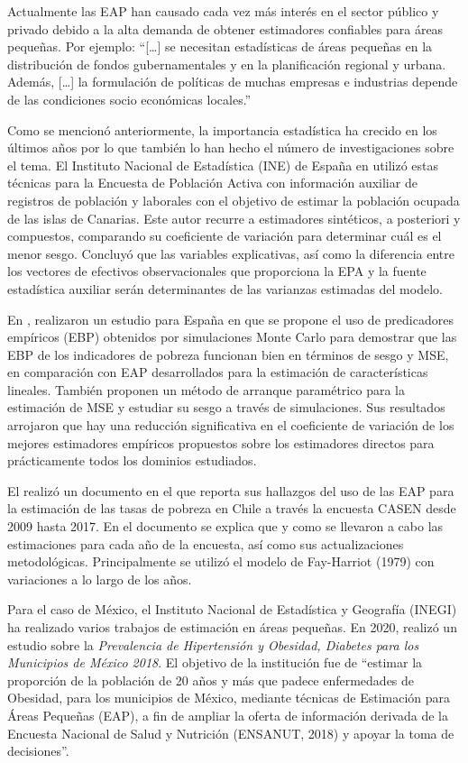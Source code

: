 \documentclass[
  11pt,
  spanish,
  oneside]{book}
\begin{document}
Actualmente las EAP han causado cada vez más interés en el sector público y privado debido a la alta demanda de obtener estimadores confiables para áreas pequeñas. Por ejemplo: ``{[}\ldots{]} se necesitan estadísticas de áreas pequeñas en la distribución de fondos gubernamentales y en la planificación regional y urbana. Además, {[}\ldots{]} la formulación de políticas de muchas empresas e industrias depende de las condiciones socio económicas locales.'' \citep[p.~56]{Gosh&Rao1994}

Como se mencionó anteriormente, la importancia estadística ha crecido en los últimos años por lo que también lo han hecho el número de investigaciones sobre el tema. El Instituto Nacional de Estadística (INE) de España en \citep{Paños2000} utilizó estas técnicas para la Encuesta de Población Activa con información auxiliar de registros de población y laborales con el objetivo de estimar la población ocupada de las islas de Canarias. Este autor recurre a estimadores sintéticos, a posteriori y compuestos, comparando su coeficiente de variación para determinar cuál es el menor sesgo. Concluyó que las variables explicativas, así como la diferencia entre los vectores de efectivos observacionales que proporciona la EPA y la fuente estadística auxiliar serán determinantes de las varianzas estimadas del modelo.

En \citep{Molina2010}, realizaron un estudio para España en que se propone el uso de predicadores empíricos (EBP) obtenidos por simulaciones Monte Carlo para demostrar que las EBP de los indicadores de pobreza funcionan bien en términos de sesgo y MSE, en comparación con EAP desarrollados para la estimación de características lineales. También proponen un método de arranque paramétrico para la estimación de MSE y estudiar su sesgo a través de simulaciones. Sus resultados arrojaron que hay una reducción significativa en el coeficiente de variación de los mejores estimadores empíricos propuestos sobre los estimadores directos para prácticamente todos los dominios estudiados.

El \citep{Ministerio2017} realizó un documento en el que reporta sus hallazgos del uso de las EAP para la estimación de las tasas de pobreza en Chile a través la encuesta CASEN desde 2009 hasta 2017. En el documento se explica que y como se llevaron a cabo las estimaciones para cada año de la encuesta, así como sus actualizaciones metodológicas. Principalmente se utilizó el modelo de Fay-Harriot (1979) con variaciones a lo largo de los años.

Para el caso de México, el Instituto Nacional de Estadística y Geografía (INEGI) ha realizado varios trabajos de estimación en áreas pequeñas. En 2020, realizó un estudio sobre la \emph{Prevalencia de Hipertensión y Obesidad, Diabetes para los Municipios de México 2018}. El objetivo de la institución fue de ``estimar la proporción de la población de 20 años y más que padece enfermedades de Obesidad, para los municipios de México, mediante técnicas de Estimación para Áreas Pequeñas (EAP), a fin de ampliar la oferta de información derivada de la Encuesta Nacional de Salud y Nutrición (ENSANUT, 2018) y apoyar la toma de decisiones''.\citep{INEGI2020EAP}
\end{document}

